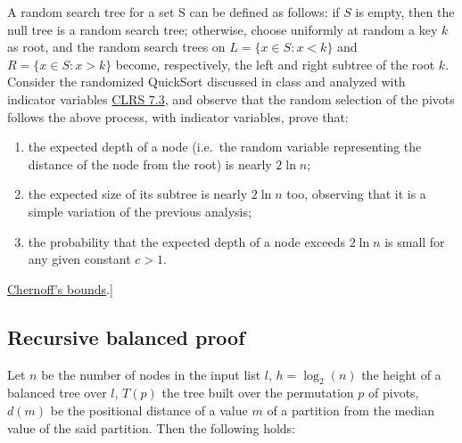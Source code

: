 \documentclass{article}
\begin{document}
A random search tree for a set S can be defined as follows: if $S$ is empty, then
the null tree is a random search tree; otherwise, choose uniformly at random a key
$k$ as root, and the random search trees on $L = \{x \in S : x < k\}$ and $R = \{x \in S :
x > k\}$ become, respectively, the left and right subtree of the root $k$.
Consider the randomized QuickSort discussed in class and analyzed with indicator
variables \href{http://didawiki.cli.di.unipi.it/lib/exe/fetch.php/magistraleinformatica/alg2/algo2_13/randqs.pdf}{CLRS 7.3},
and observe that the random selection of the pivots follows the above process,
with indicator variables, prove that:
\begin{enumerate}
  \item the expected depth of a node (i.e.\ the random variable representing the distance of the node from the root) is nearly $2 \ln n$;
  \item the expected size of its subtree is nearly $2 \ln n$ too, observing that it is a simple variation of the previous analysis;
  \item the probability that the expected depth of a node exceeds $2\ln n$ is small for any given constant $c > 1$.
\end{enumerate}
\href{https://en.wikipedia.org/wiki/Chernoff_bound}{Chernoff’s bounds}.]

\subsection{Recursive balanced proof}

Let $n$ be the number of nodes in the input list $l$, $h = \log_2(n)$ the height
of a balanced tree over $l$, $T(p)$ the tree built over the permutation $p$ of pivots,
$d(m)$ be the positional distance of a value $m$ of a partition from the median
value of the said partition.
Then the following holds:
\end{document}
